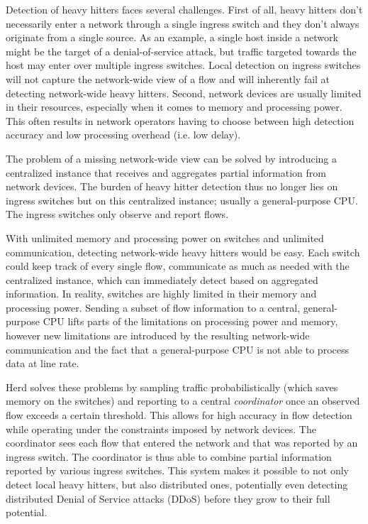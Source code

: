 \documentclass[11pt,oneside,a4paper]{article}
\begin{document}
Detection of heavy hitters faces several challenges. First of all, heavy hitters don't necessarily enter a network through a single ingress switch and they don't always originate from a single source. As an example, a single host inside a network might be the target of a denial-of-service attack, but traffic targeted towards the host may enter over multiple ingress switches. Local detection on ingress switches will not capture the network-wide view of a flow and will inherently fail at detecting network-wide heavy hitters. Second, network devices are usually limited in their resources, especially when it comes to memory and processing power. This often results in network operators having to choose between high detection accuracy and low processing overhead (i.e. low delay).

\noindent The problem of a missing network-wide view can be solved by introducing a centralized instance that receives and aggregates partial information from network devices. The burden of heavy hitter detection thus no longer lies on ingress switches but on this centralized instance; usually a general-purpose CPU. The ingress switches only observe and report flows.

\noindent With unlimited memory and processing power on switches and unlimited communication, detecting network-wide heavy hitters would be easy. Each switch could keep track of every single flow, communicate as much as needed with the centralized instance, which can immediately detect based on aggregated information. In reality, switches are highly limited in their memory and processing power. Sending a subset of flow information to a central, general-purpose CPU lifts parts of the limitations on processing power and memory, however new limitations are introduced by the resulting network-wide communication and the fact that a general-purpose CPU is not able to process data at line rate.

Herd \cite{anon2019herd} solves these problems by sampling traffic probabilistically (which saves memory on the switches) and reporting to a central \textit{coordinator} once an observed flow exceeds a certain threshold. This allows for high accuracy in flow detection while operating under the constraints imposed by network devices. The coordinator sees each flow that entered the network and that was reported by an ingress switch. The coordinator is thus able to combine partial information reported by various ingress switches. This system makes it possible to not only detect local heavy hitters, but also distributed ones, potentially even detecting distributed Denial of Service attacks (DDoS) before they grow to their full potential.
\end{document}
